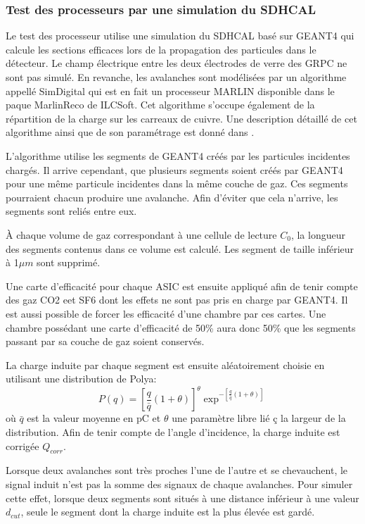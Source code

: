 \subsubsection{Test des processeurs par une simulation du SDHCAL}
Le test des processeur utilise une simulation du SDHCAL basé sur GEANT4\cite{AGOSTINELLI2003250} qui calcule les sections efficaces lors de la propagation des particules dans le détecteur. Le champ électrique entre les deux électrodes de verre des GRPC ne sont pas simulé. En revanche, les avalanches sont modélisées par un algorithme appellé SimDigital qui est en fait un processeur MARLIN disponible dans le paque MarlinReco \cite{2007Prama} de ILCSoft. Cet algorithme s'occupe également de la répartition de la charge sur les carreaux de cuivre. Une description détaillé de cet algorithme ainsi que de son paramétrage est donné dans \cite{steen:tel-01282680}.

L'algorithme utilise les segments de GEANT4 créés par les particules incidentes chargés. Il arrive cependant, que plusieurs segments soient créés par GEANT4 pour une même particule incidentes dans la même couche de gaz. Ces segments pourraient chacun produire une avalanche. Afin d'éviter que cela n'arrive, les segments sont reliés entre eux.

 À chaque volume de gaz correspondant à une cellule de lecture $C_{0}$, la longueur des segments contenus dans ce volume est calculé. Les segment de taille inférieur à 1$\mu m$ sont supprimé.
 
 Une carte d'efficacité pour chaque ASIC est ensuite appliqué afin de tenir compte des gaz CO2 eet SF6 dont les effets ne sont pas pris en charge par GEANT4. Il est aussi possible de forcer les efficacité d'une chambre par ces cartes. Une chambre possédant une carte d'efficacité de 50\% aura donc 50\% que les segments passant par sa couche de gaz soient conservés.
 
 La charge induite par chaque segment est ensuite aléatoirement choisie en utilisant une distribution de Polya:
 \begin{equation}
 P(q)=\left[\frac{q}{\bar{q}}(1+\theta)\right]^\theta\exp^{-\left[\frac{q}{\bar{q}}(1+\theta)\right]}
 \end{equation}
 où $\bar{q}$ est la valeur moyenne en pC et $\theta$ une paramètre libre lié ç la largeur de la distribution. Afin de tenir compte de l'angle d'incidence, la charge induite est corrigée $Q_{corr}$.
 
 Lorsque deux avalanches sont très proches l'une de l'autre et se chevauchent, le signal induit n'est pas la somme des signaux de chaque avalanches. Pour simuler cette effet, lorsque deux segments sont situés à une distance inférieur à une valeur $d_{cut}$, seule le segment dont la charge induite est la plus élevée est gardé.
 
